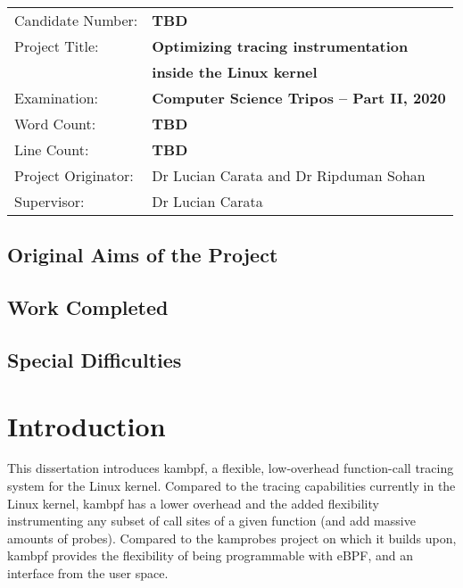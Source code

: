 \documentclass[12pt,twoside,notitlepage]{report}
\begin{document}
{\large
\begin{tabular}{ll}
Candidate Number:   & \bf TBD                   \\
Project Title:      & \bf Optimizing tracing instrumentation \\
                    & \bf inside the Linux kernel \\
Examination:        & \bf Computer Science Tripos -- Part II, 2020      \\
Word Count:         & \bf TBD \\
Line Count:         & \bf TBD \\
Project Originator: & Dr Lucian Carata and Dr Ripduman Sohan     \\
Supervisor:         & Dr Lucian Carata                  \\ 
\end{tabular}
}


\section*{Original Aims of the Project}


\section*{Work Completed}


\section*{Special Difficulties}



\tableofcontents

\listoffigures


\cleardoublepage        %

\setcounter{page}{1}
\pagestyle{headings}

\chapter{Introduction}
    This dissertation introduces kambpf, a flexible, low-overhead function-call tracing system for the Linux kernel. Compared to the tracing capabilities currently in the Linux kernel, kambpf has a lower overhead and the added flexibility instrumenting any subset of call sites of a given function (and add massive amounts of probes). Compared to the kamprobes project on which it builds upon, kambpf provides the flexibility of being programmable with eBPF, and an interface from the user space. 
\end{document}
